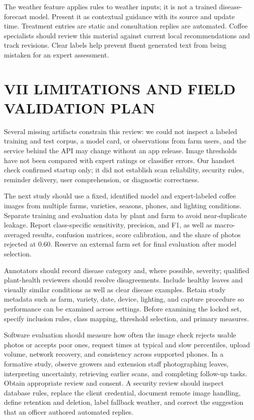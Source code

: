 \documentclass[conference]{IEEEtran}
\begin{document}
The weather feature applies rules to weather inputs; it is not a trained disease-forecast model. Present it as contextual guidance with its source and update time. Treatment entries are static and consultation replies are automated. Coffee specialists should review this material against current local recommendations and track revisions. Clear labels help prevent fluent generated text from being mistaken for an expert assessment.

\section*{VII LIMITATIONS AND FIELD VALIDATION PLAN}

Several missing artifacts constrain this review: we could not inspect a labeled training and test corpus, a model card, or observations from farm users, and the service behind the API may change without an app release. Image thresholds have not been compared with expert ratings or classifier errors. Our handset check confirmed startup only; it did not establish scan reliability, security rules, reminder delivery, user comprehension, or diagnostic correctness.

The next study should use a fixed, identified model and expert-labeled coffee images from multiple farms, varieties, seasons, phones, and lighting conditions. Separate training and evaluation data by plant and farm to avoid near-duplicate leakage. Report class-specific sensitivity, precision, and F1, as well as macro-averaged results, confusion matrices, score calibration, and the share of photos rejected at 0.60. Reserve an external farm set for final evaluation after model selection.

Annotators should record disease category and, where possible, severity; qualified plant-health reviewers should resolve disagreements. Include healthy leaves and visually similar conditions as well as clear disease examples. Retain study metadata such as farm, variety, date, device, lighting, and capture procedure so performance can be examined across settings. Before examining the locked set, specify inclusion rules, class mapping, threshold selection, and primary measures.

Software evaluation should measure how often the image check rejects usable photos or accepts poor ones, request times at typical and slow percentiles, upload volume, network recovery, and consistency across supported phones. In a formative study, observe growers and extension staff photographing leaves, interpreting uncertainty, retrieving earlier scans, and completing follow-up tasks. Obtain appropriate review and consent. A security review should inspect database rules, replace the client credential, document remote image handling, define retention and deletion, label fallback weather, and correct the suggestion that an officer authored automated replies.
\end{document}
